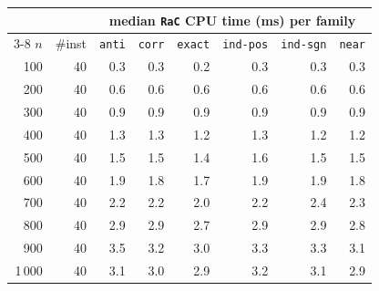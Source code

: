 \begin{tabular}{@{}rrrrrrrr@{}}
\toprule
 &  & \multicolumn{6}{c}{median \texttt{RaC} CPU time (ms) per family} \\
\cmidrule(l){3-8}
$n$ & \#inst & \texttt{anti} & \texttt{corr} & \texttt{exact} & \texttt{ind-pos} & \texttt{ind-sgn} & \texttt{near} \\
\midrule
100 & 40 & 0.3 & 0.3 & 0.2 & 0.3 & 0.3 & 0.3 \\
200 & 40 & 0.6 & 0.6 & 0.6 & 0.6 & 0.6 & 0.6 \\
300 & 40 & 0.9 & 0.9 & 0.9 & 0.9 & 0.9 & 0.9 \\
400 & 40 & 1.3 & 1.3 & 1.2 & 1.3 & 1.2 & 1.2 \\
500 & 40 & 1.5 & 1.5 & 1.4 & 1.6 & 1.5 & 1.5 \\
600 & 40 & 1.9 & 1.8 & 1.7 & 1.9 & 1.9 & 1.8 \\
700 & 40 & 2.2 & 2.2 & 2.0 & 2.2 & 2.4 & 2.3 \\
800 & 40 & 2.9 & 2.9 & 2.7 & 2.9 & 2.9 & 2.8 \\
900 & 40 & 3.5 & 3.2 & 3.0 & 3.3 & 3.3 & 3.1 \\
1\,000 & 40 & 3.1 & 3.0 & 2.9 & 3.2 & 3.1 & 2.9 \\
\bottomrule
\end{tabular}
